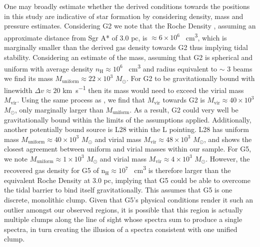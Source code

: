 \documentclass[twocolumn]{aastex631}
\begin{document}
One may broadly estimate whether the derived conditions towards the positions in this study are indicative of star formation by considering density, mass and pressure estimates. Considering G2 we note that the Roche Density \citep{rocheDensity}, assuming an approximate distance from Sgr A* of 3.0 pc, is $\approx 6 \times 10^{6}$ \si{\per\centi\meter\cubed}, which is marginally smaller than the derived gas density towards G2 thus implying tidal stability. Considering an estimate of the mass, assuming that G2 is spherical and uniform with average density $n_{\mathrm{H}} \approx 10^{6}$ \si{\per\centi\meter\cubed} and radius equivalent to $\sim$ 3 beams we find its mass $M_{\mathrm{uniform}} \approx 22 \times 10^{3} $ $M_{\odot}$. For G2 to be gravitationally bound with linewidth $\Delta v \approx 20$ \si{\kilo\meter\per\second} then its mass would need to exceed the virial mass $M_{\mathrm{vir}}$. Using the same process as \citet{Christopher2005}, we find that $M_{\mathrm{vir}}$ towards G2 is $M_{\mathrm{vir}} \approx 40 \times 10^{3}$ $M_{\odot}$, only marginally larger than $M_{\mathrm{uniform}}$. As a result, G2 could very well be gravitationally bound within the limits of the assumptions applied. Additionally, another potentially bound source is L28 within the L pointing. L28 has uniform mass $M_{\mathrm{uniform}} \approx 40 \times 10^{3} $ $M_{\odot}$ and virial mass $M_{\mathrm{vir}} \approx 48 \times 10^{3}$ $M_{\odot}$, and shows the closest agreement between uniform and virial masses within our sample. For G5, we note $M_{\mathrm{uniform}} \approx 1 \times 10^{3} $ $M_{\odot}$ and virial mass $M_{\mathrm{vir}} \approx 4 \times 10^{3}$ $M_{\odot}$. However, the recovered gas density for G5 of $\mathrm{n_{H}} \approx 10^{7}$ \si{\per\centi\meter\cubed} is therefore larger than the equivalent Roche Density at 3.0 pc, implying that G5 could be able to overcome the tidal barrier to bind itself gravitationally. This assumes that G5 is one discrete, monolithic clump. Given that G5's physical conditions render it such an outlier amongst our observed regions, it is possible that this region is actually multiple clumps along the line of sight whose spectra sum to produce a single spectra, in turn creating the illusion of a spectra consistent with one unified clump.
\end{document}
